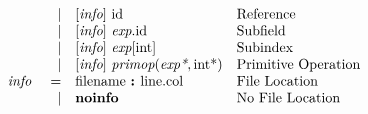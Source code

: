 \documentclass[12pt]{article}
\begin{document}
{\[\begin{array}{rrll}
                &\vert &[\text{\em info}]\  \text{id }                                                                     &\text{Reference}\\
                &\vert &[\text{\em info}]\  \text{\em exp}.\text{id }                                                           &\text{Subfield}\\
                &\vert &[\text{\em info}]\  \text{\em exp}[\text{int}]                                                        &\text{Subindex}\\
                &\vert &[\text{\em info}]\  \text{\em primop}(\text{\em exp*}, \text{int}\text{*})                                 &\text{Primitive Operation}\\
\text{\em info\ }       &=     &\text{filename } \text{\bf :\ } \text{line} . \text{col}                              &\text{File Location}\\
                &\vert &\text{\bf noinfo\ }                                                                   &\text{No File Location}\\
\end{array}
\]
}
\end{document}
